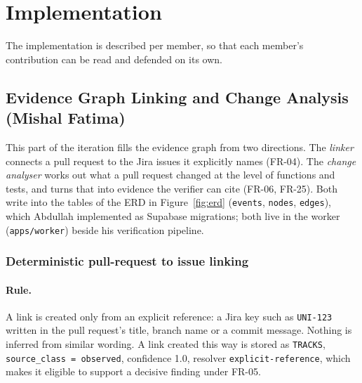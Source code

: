 \section{Implementation}
\label{sec:ch6-implementation}

The implementation is described per member, so that each member's contribution
can be read and defended on its own.

\subsection{Evidence Graph Linking and Change Analysis (Mishal Fatima)}
\label{sec:impl-linking-analyser}

This part of the iteration fills the evidence graph from two directions. The
\emph{linker} connects a pull request to the Jira issues it explicitly names
(FR-04). The \emph{change analyser} works out what a pull request changed at
the level of functions and tests, and turns that into evidence the verifier
can cite (FR-06, FR-25). Both write into the tables of the ERD in
Figure~\ref{fig:erd} (\texttt{events}, \texttt{nodes}, \texttt{edges}), which
Abdullah implemented as Supabase migrations; both live in the worker
(\texttt{apps/\allowbreak{}worker}) beside his verification pipeline.

\subsubsection{Deterministic pull-request to issue linking}

\paragraph{Rule.} A link is created only from an explicit reference: a Jira key
such as \texttt{UNI-123} written in the pull request's title, branch name or a
commit message. Nothing is inferred from similar wording. A link created this
way is stored as \texttt{TRACKS}, \texttt{source\_class = observed},
confidence 1.0, resolver \texttt{explicit-reference}, which makes it eligible
to support a decisive finding under FR-05.


